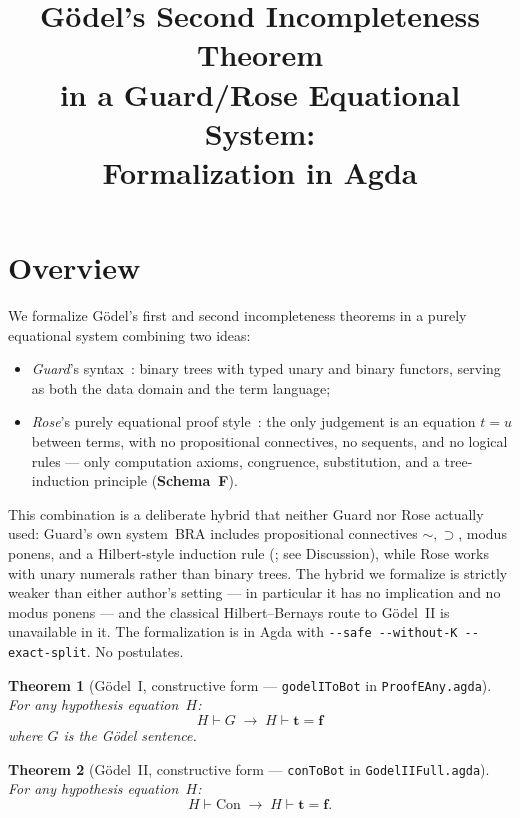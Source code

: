\documentclass[11pt]{article}
\title{G\"odel's Second Incompleteness Theorem\\
  in a Guard/Rose Equational System:\\
  Formalization in Agda}
\author{}
\date{}
\newtheorem{theorem}{Theorem}
\newcommand{\trueT}{\mathbf{t}}
\newcommand{\falseT}{\mathbf{f}}
\newcommand{\SchemaF}{\textbf{Schema~F}}
\begin{document}
\maketitle

\section{Overview}

We formalize G\"odel's first and second incompleteness theorems
in a purely equational system combining two ideas:
\begin{itemize}
\item \emph{Guard}'s syntax~\cite{guard1963}: binary trees with
  typed unary and binary functors, serving as both the data domain
  and the term language;
\item \emph{Rose}'s purely equational proof style~\cite{rose1961}:
  the only judgement is an equation $t = u$ between terms, with no
  propositional connectives, no sequents, and no logical rules ---
  only computation axioms, congruence, substitution, and a
  tree-induction principle (\SchemaF).
\end{itemize}
This combination is a deliberate hybrid that neither Guard nor
Rose actually used: Guard's own system~BRA includes propositional
connectives $\sim, \supset$, modus ponens, and a Hilbert-style
induction rule (\cite[p.~10]{guard1963}; see Discussion), while
Rose works with unary numerals rather than binary trees.  The
hybrid we formalize is strictly weaker than either author's
setting --- in particular it has no implication and no modus
ponens --- and the classical Hilbert--Bernays route to
G\"odel~II is unavailable in it.
The formalization is in Agda with
\texttt{-{}-safe -{}-without-K -{}-exact-split}.  No postulates.

\begin{theorem}[G\"odel~I, constructive form --- \texttt{godelIToBot} in \texttt{ProofEAny.agda}]
\label{thm:godel1c}
For any hypothesis equation~$H$:
\[
  H \vdash G \;\to\; H \vdash \trueT = \falseT
\]
where $G$ is the G\"odel sentence.
\end{theorem}

\begin{theorem}[G\"odel~II, constructive form --- \texttt{conToBot} in \texttt{GodelIIFull.agda}]
\label{thm:godel2c}
For any hypothesis equation~$H$:
\[
  H \vdash \mathrm{Con} \;\to\;
  H \vdash \trueT = \falseT.
\]
\end{theorem}
\end{document}
